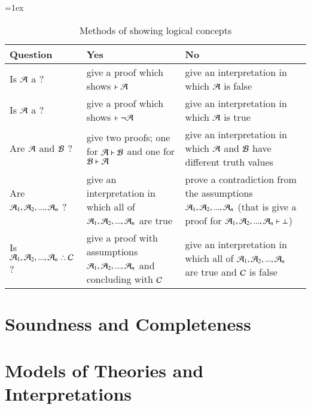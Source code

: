 \documentclass[12pt, a4paper, twoside, openright, titlepage]{book}
\begin{document}
\begin{table}[H]
\tabulinesep=1ex
\begin{tabu}{X[.5,c,m] ||X[1,l,m] |X[1,l,m]}
\textbf{Question} 		&	\textbf{Yes} 	&	\textbf{No} \\ \hline \hline

    Is $\mathcal{A}$ a ?  &	give a proof which shows $\vdash \mathcal{A}$ & give an interpretation in which $\mathcal{A}$ is false	 \\ \hline
 
Is $\mathcal{A}$ a ?  &	give a proof which shows $\vdash\neg \mathcal{A}$ & give an interpretation in which $\mathcal{A}$ is true	 \\ \hline

    Are $\mathcal{A}$ and $\mathcal{B}$ ? &	give two proofs; one for $\mathcal{A}\vdash \mathcal{B}$ and one for $\mathcal{B}\vdash\mathcal{A}$ & give an interpretation in which $\mathcal{A}$ and $\mathcal{B}$ have different truth values	 \\ \hline


    Are $\mathcal{A}_1,\mathcal{A}_2,...,\mathcal{A}_n$ ? &	give an interpretation in which all of $\mathcal{A}_1,\mathcal{A}_2,...,\mathcal{A}_n$ are true & prove a contradiction from the assumptions $\mathcal{A}_1,\mathcal{A}_2,...,\mathcal{A}_n$ (that is give a proof for $\mathcal{A}_1,\mathcal{A}_2,...,\mathcal{A}_n\vdash \bot$)	 \\ \hline
    Is $\metav{A}_1,\metav{A}_2,...,\metav{A}_n\therefore\metav{C}$ ? &	give a proof with assumptions $\mathcal{A}_1,\mathcal{A}_2,...,\mathcal{A}_n$ and concluding with $\mathcal{C}$ & give an interpretation in which all of $\mathcal{A}_1,\mathcal{A}_2,...,\mathcal{A}_n$ are true and $\mathcal{C}$ is false \\ \hline
\end{tabu}
\caption{Methods of showing logical concepts}
\label{table:proofs_or_interpretations}
\end{table}




\chapter{\textsection\textsection Soundness and Completeness}


\chapter{\textsection\textsection Models of Theories and Interpretations}
\end{document}
